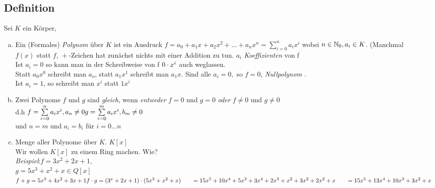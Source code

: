 \subsection{Definition}\label{sec:1.19}
Sei $K$ ein Körper,
\begin{enumerate}[a)]
\item Ein (Formales) \emph{Polynom} über $K$ ist ein Ausdruck $f = a_0 + a_1x + a_2x^2 +\ldots+ a_n x^n = \sum\limits_{i=0}^{n}a_ix^i$ wobei $n \in \mathbb{N}_0, a_i \in K$.
(Manchmal $f(x)$ statt $f,\,+$-Zeichen hat zunächst nichts mit einer Addition zu tun.
$a_i$ \emph{Koeffizienten} von f\\
Ist $a_i = 0$ so kann man in der Schreibweise von f $0 \cdot x^i$ auch weglassen.\\
Statt $a_0x^0$ schreibt man $a_o$, statt $a_1x^1$ schreibt man $a_1x$. Sind alle $a_i =0,$ so $f = 0$, \emph{Nullpolynom} .\\ Ist $a_i = 1$, so schreibt man $x^i$ statt $1x^i$
\item Zwei Polynome $f$ und $g$ sind \emph{gleich}, wenn \emph{entweder} $f=0$ und $g=0$ \emph{oder} $f \ne 0$ und $g \ne 0$\\
d.h $f = \sum\limits_{i = 0}^{n} a_ix^i, a_n \ne 0\\
g = \sum\limits_{i = 0}^{m} a_ix^i, b_m \ne 0$\\
und $n=m$ und $a_i = b_i$ für $i=0...n$
\item Menge aller Polynome über $K$. $K[x]$\\
Wir wollen $K[x]$ zu einem Ring machen. Wie?\\
\emph{Beispiel}:$f = 3x^2+2x+1,$\\
$g = 5x^3 + x^2 + x \in Q[x]$\\
$f + g = 5x^3 + 4x^2 + 3x + 1\\
f \cd g = (3^x + 2x + 1)\cd(5x^3 + x^2+ x)\\
\phantom{f \cd g} = 15x^5 + 10 x^4 + 5 x^3 + 3x^4 + 2x^3 + x^2 + 3x^2 + 2x^2 + x\\
\phantom{f \cd g} = 15x^5 + 13x^4+10x^3+3x^2+x$
\end{enumerate}

